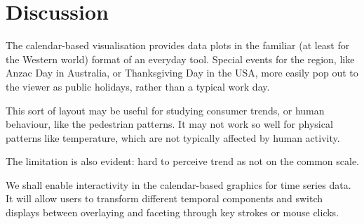 \documentclass[article]{jss}
\begin{document}
\section{Discussion}\label{discussion}

\label{sec:discussion}

The calendar-based visualisation provides data plots in the familiar (at
least for the Western world) format of an everyday tool. Special events
for the region, like Anzac Day in Australia, or Thanksgiving Day in the
USA, more easily pop out to the viewer as public holidays, rather than a
typical work day.

This sort of layout may be useful for studying consumer trends, or human
behaviour, like the pedestrian patterns. It may not work so well for
physical patterns like temperature, which are not typically affected by
human activity.

The limitation is also evident: hard to perceive trend as not on the
common scale.

We shall enable interactivity in the calendar-based graphics for time
series data. It will allow users to transform different temporal
components and switch displays between overlaying and faceting through
key strokes or mouse clicks.


\end{document}

